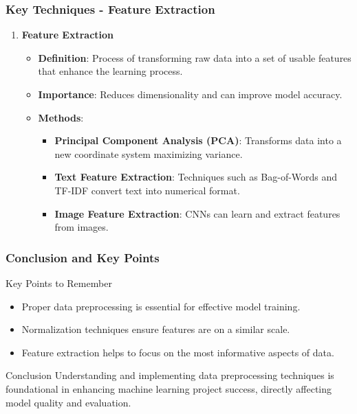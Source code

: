 \documentclass[aspectratio=169]{beamer}
\begin{document}
\begin{frame}[fragile]
    \frametitle{Key Techniques - Feature Extraction}
    \begin{enumerate}
        \item \textbf{Feature Extraction}
        \begin{itemize}
            \item \textbf{Definition}: Process of transforming raw data into a set of usable features that enhance the learning process.
            \item \textbf{Importance}: Reduces dimensionality and can improve model accuracy.
            \item \textbf{Methods}:
            \begin{itemize}
                \item \textbf{Principal Component Analysis (PCA)}: Transforms data into a new coordinate system maximizing variance.
                \item \textbf{Text Feature Extraction}: Techniques such as Bag-of-Words and TF-IDF convert text into numerical format.
                \item \textbf{Image Feature Extraction}: CNNs can learn and extract features from images.
            \end{itemize}
        \end{itemize}
    \end{enumerate}
\end{frame}

\begin{frame}[fragile]
    \frametitle{Conclusion and Key Points}
    \begin{block}{Key Points to Remember}
        \begin{itemize}
            \item Proper data preprocessing is essential for effective model training.
            \item Normalization techniques ensure features are on a similar scale.
            \item Feature extraction helps to focus on the most informative aspects of data.
        \end{itemize}
    \end{block}

    \begin{block}{Conclusion}
        Understanding and implementing data preprocessing techniques is foundational in enhancing machine learning project success, directly affecting model quality and evaluation.
    \end{block}
\end{frame}
\end{document}
